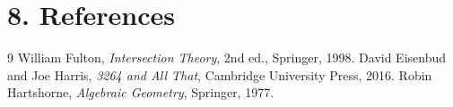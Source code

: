 \section*{8. References}

\begin{thebibliography}{9}
 William Fulton, \emph{Intersection Theory}, 2nd ed., Springer, 1998.
 David Eisenbud and Joe Harris, \emph{3264 and All That}, Cambridge University Press, 2016.
 Robin Hartshorne, \emph{Algebraic Geometry}, Springer, 1977.
\end{thebibliography}

